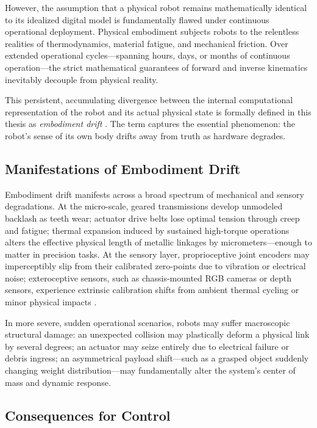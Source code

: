 \documentclass[12pt,a4paper,oneside]{report}
\begin{document}
However, the assumption that a physical robot remains mathematically identical to its idealized digital model is fundamentally flawed under continuous operational deployment. Physical embodiment subjects robots to the relentless realities of thermodynamics, material fatigue, and mechanical friction. Over extended operational cycles—spanning hours, days, or months of continuous operation—the strict mathematical guarantees of forward and inverse kinematics inevitably decouple from physical reality.

This persistent, accumulating divergence between the internal computational representation of the robot and its actual physical state is formally defined in this thesis as \textit{embodiment drift} \cite{bongard2006resilient, kwiatkowski2019task}. The term captures the essential phenomenon: the robot's sense of its own body drifts away from truth as hardware degrades.

\subsection{Manifestations of Embodiment Drift}

Embodiment drift manifests across a broad spectrum of mechanical and sensory degradations. At the micro-scale, geared transmissions develop unmodeled backlash as teeth wear; actuator drive belts lose optimal tension through creep and fatigue; thermal expansion induced by sustained high-torque operations alters the effective physical length of metallic linkages by micrometers—enough to matter in precision tasks. At the sensory layer, proprioceptive joint encoders may imperceptibly slip from their calibrated zero-points due to vibration or electrical noise; exteroceptive sensors, such as chassis-mounted RGB cameras or depth sensors, experience extrinsic calibration shifts from ambient thermal cycling or minor physical impacts \cite{rezvani2024robust}.

In more severe, sudden operational scenarios, robots may suffer macroscopic structural damage: an unexpected collision may plastically deform a physical link by several degrees; an actuator may seize entirely due to electrical failure or debris ingress; an asymmetrical payload shift—such as a grasped object suddenly changing weight distribution—may fundamentally alter the system's center of mass and dynamic response.

\subsection{Consequences for Control}
\end{document}
